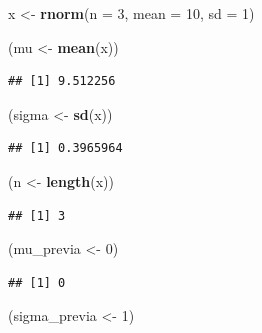 \documentclass[
  12pt,
]{book}
\newenvironment{Shaded}{\begin{snugshade}}{\end{snugshade}}
\newcommand{\DataTypeTok}[1]{\textcolor[rgb]{0.13,0.29,0.53}{#1}}
\newcommand{\DecValTok}[1]{\textcolor[rgb]{0.00,0.00,0.81}{#1}}
\newcommand{\KeywordTok}[1]{\textcolor[rgb]{0.13,0.29,0.53}{\textbf{#1}}}
\newcommand{\NormalTok}[1]{#1}
\newcommand{\StringTok}[1]{\textcolor[rgb]{0.31,0.60,0.02}{#1}}
\begin{document}
\begin{Shaded}
\begin{Highlighting}[]
\NormalTok{x \textless{}{-}}\StringTok{ }\KeywordTok{rnorm}\NormalTok{(}\DataTypeTok{n =} \DecValTok{3}\NormalTok{, }\DataTypeTok{mean =} \DecValTok{10}\NormalTok{, }\DataTypeTok{sd =} \DecValTok{1}\NormalTok{)}

\NormalTok{(mu \textless{}{-}}\StringTok{ }\KeywordTok{mean}\NormalTok{(x))}
\end{Highlighting}
\end{Shaded}

\begin{verbatim}
## [1] 9.512256
\end{verbatim}

\begin{Shaded}
\begin{Highlighting}[]
\NormalTok{(sigma \textless{}{-}}\StringTok{ }\KeywordTok{sd}\NormalTok{(x))}
\end{Highlighting}
\end{Shaded}

\begin{verbatim}
## [1] 0.3965964
\end{verbatim}

\begin{Shaded}
\begin{Highlighting}[]
\NormalTok{(n \textless{}{-}}\StringTok{ }\KeywordTok{length}\NormalTok{(x))}
\end{Highlighting}
\end{Shaded}

\begin{verbatim}
## [1] 3
\end{verbatim}

\begin{Shaded}
\begin{Highlighting}[]
\NormalTok{(mu\_previa \textless{}{-}}\StringTok{ }\DecValTok{0}\NormalTok{)}
\end{Highlighting}
\end{Shaded}

\begin{verbatim}
## [1] 0
\end{verbatim}

\begin{Shaded}
\begin{Highlighting}[]
\NormalTok{(sigma\_previa \textless{}{-}}\StringTok{ }\DecValTok{1}\NormalTok{)}
\end{Highlighting}
\end{Shaded}
\end{document}
